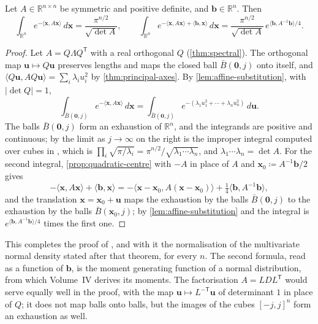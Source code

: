 \begin{theorem}
\label{thm:gaussian-general}
Let $A\in\mathbb R^{n\times n}$ be symmetric and positive definite, and $\mathbf b\in\mathbb R^n$. Then
\[
\int_{\mathbb R^n}e^{-\langle\mathbf x,A\mathbf x\rangle}\,d\mathbf x=\frac{\pi^{n/2}}{\sqrt{\det A}},\qquad\int_{\mathbb R^n}e^{-\langle\mathbf x,A\mathbf x\rangle+\langle\mathbf b,\mathbf x\rangle}\,d\mathbf x=\frac{\pi^{n/2}}{\sqrt{\det A}}\,e^{\langle\mathbf b,A^{-1}\mathbf b\rangle/4}.
\]
\end{theorem}

\begin{proof}
Let $A=Q\Lambda Q^{\mathsf T}$ with a real orthogonal $Q$ (\cref{thm:spectral}). The orthogonal map $\mathbf u\mapsto Q\mathbf u$ preserves lengths and maps the closed ball $\bar B(\mathbf 0,j)$ onto itself, and $\langle Q\mathbf u,AQ\mathbf u\rangle=\sum_i\lambda_iu_i^2$ by \cref{thm:principal-axes}. By \cref{lem:affine-substitution}, with $|\det Q|=1$,
\[
\int_{\bar B(\mathbf 0,j)}e^{-\langle\mathbf x,A\mathbf x\rangle}\,d\mathbf x=\int_{\bar B(\mathbf 0,j)}e^{-(\lambda_1u_1^2+\cdots+\lambda_nu_n^2)}\,d\mathbf u .
\]
The balls $\bar B(\mathbf 0,j)$ form an exhaustion of $\mathbb R^n$, and the integrands are positive and continuous; by  the limit as $j\to\infty$ on the right is the improper integral computed over cubes in , which is $\prod_i\sqrt{\pi/\lambda_i}=\pi^{n/2}/\sqrt{\lambda_1\cdots\lambda_n}$, and $\lambda_1\cdots\lambda_n=\det A$. For the second integral, \cref{prop:quadratic-centre} with $-A$ in place of $A$ and $\mathbf x_0\coloneqq A^{-1}\mathbf b/2$ gives
\[
-\langle\mathbf x,A\mathbf x\rangle+\langle\mathbf b,\mathbf x\rangle=-\langle\mathbf x-\mathbf x_0,A(\mathbf x-\mathbf x_0)\rangle+\tfrac14\langle\mathbf b,A^{-1}\mathbf b\rangle ,
\]
and the translation $\mathbf x=\mathbf x_0+\mathbf u$ maps the exhaustion by the balls $\bar B(\mathbf 0,j)$ to the exhaustion by the balls $\bar B(\mathbf x_0,j)$; by \cref{lem:affine-substitution} and  the integral is $e^{\langle\mathbf b,A^{-1}\mathbf b\rangle/4}$ times the first one.
\end{proof}

This completes the proof of , and with it the normalisation of the multivariate normal density stated after that theorem, for every $n$. The second formula, read as a function of $\mathbf b$, is the moment generating function of a normal distribution, from which Volume~IV derives its moments. The factorisation $A=LDL^{\mathsf T}$ would serve equally well in the proof, with the map $\mathbf u\mapsto L^{-\mathsf T}\mathbf u$ of determinant $1$ in place of $Q$; it does not map balls onto balls, but the images of the cubes $[-j,j]^n$ form an exhaustion as well.

